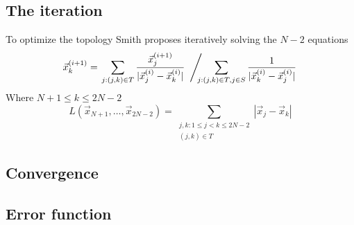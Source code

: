 
\subsection{The iteration}
\label{sec:iteration}

To optimize the topology Smith proposes iteratively solving the $N-2$ equations
%
\begin{equation}
  \label{eq:6} \vec x_k^{(i+1)} = \left.  \sum_{j : (j, k) \in T} \frac{\vec
x_j^{(i+1)}}{|\vec x_j^{(i)} - \vec x_k^{(i)}|}
\hspace{0.5em}\middle/\hspace{-0.5em} \sum_{j: (j,k) \in T, j \in S}
\frac{1}{|\vec x_k^{(i)} - \vec x_j^{(i)}|} \right.
\end{equation}
%
Where $ N+1 \le k \le 2N-2$
%
\begin{equation} L(\vec x_{N+1}, \ldots, \vec x_{2N-2}) = \sum_{\begin{array}{c}
j,k: 1 \le j < k \le 2 N - 2 \\ (j,k) \in T
\end{array}} | \vec x_{j} - \vec x_{k} |
\label{eq:length}
\end{equation}
%

\subsection{Convergence}
\label{sec:convergence} 

\subsection{Error function}
\label{sec:error-function}

